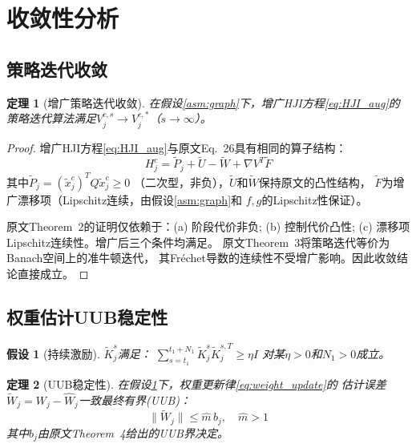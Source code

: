 \documentclass[11pt,a4paper]{article}
\newtheorem{theorem}{定理}
\newtheorem{assumption}{假设}
\begin{document}
\section{收敛性分析}

\subsection{策略迭代收敛}

\begin{theorem}[增广策略迭代收敛]\label{thm:convergence}
  在假设\ref{asm:graph}下，增广HJI方程\eqref{eq:HJI_aug}的
  策略迭代算法满足$V_j^{c,s} \to V_j^{c,*}$（$s \to \infty$）。
\end{theorem}

\begin{proof}
  增广HJI方程\eqref{eq:HJI_aug}与原文Eq.~26具有相同的算子结构：
  \[
    H_j^c = \tilde{P}_j + \tilde{U} - \tilde{W} + \nabla V^T \tilde{F}
  \]
  其中$\tilde{P}_j = (\tilde{x}_j^c)^T Q \tilde{x}_j^c \geq 0$
  （二次型，非负），$\tilde{U}$和$\tilde{W}$保持原文的凸性结构，
  $\tilde{F}$为增广漂移项（Lipschitz连续，由假设\ref{asm:graph}和
  $f, g$的Lipschitz性保证）。

  原文Theorem~2的证明仅依赖于：(a) 阶段代价非负; (b) 控制代价凸性;
  (c) 漂移项Lipschitz连续性。增广后三个条件均满足。
  原文Theorem~3将策略迭代等价为Banach空间上的准牛顿迭代，
  其Fr\'{e}chet导数的连续性不受增广影响。因此收敛结论直接成立。
\end{proof}

\subsection{权重估计UUB稳定性}

\begin{assumption}[持续激励]\label{asm:PE}
  $\tilde{K}_j^s$满足：
  $\sum_{s=t_1}^{t_1+N_1} \tilde{K}_j^s \tilde{K}_j^{s,T} \geq \eta I$
  对某$\eta > 0$和$N_1 > 0$成立。
\end{assumption}

\begin{theorem}[UUB稳定性]\label{thm:uub}
  在假设\ref{asm:PE}下，权重更新律\eqref{eq:weight_update}的
  估计误差$\tilde{W}_j = W_j - \hat{W}_j$一致最终有界(UUB)：
  \begin{equation}
    \|\tilde{W}_j\| \leq \hat{m}\, b_j, \quad \hat{m} > 1
  \end{equation}
  其中$b_j$由原文Theorem~4给出的UUB界决定。
\end{theorem}
\end{document}
